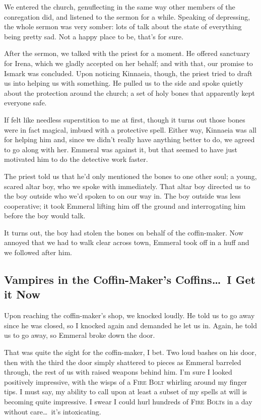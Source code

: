 We entered the church, genuflecting in the same way other members of the conregation did, and listened to the sermon for a while. Speaking of depressing, the whole sermon was very somber: lots of talk about the state of everything being pretty sad. Not a happy place to be, that's for sure.

After the sermon, we talked with the priest for a moment. He offered sanctuary for Irena, which we gladly accepted on her behalf; and with that, our promise to Ismark was concluded. Upon noticing Kinnaeia, though, the priest tried to draft us into helping us with something. He pulled us to the side and spoke quietly about the protection around the church; a set of holy bones that apparently kept everyone safe.

If felt like needless superstition to me at first, though it turns out those bones were in fact magical, imbued with a protective spell. Either way, Kinnaeia was all for helping him and, since we didn't really have anything better to do, we agreed to go along with her. Emmeral was against it, but that seemed to have just motivated him to do the detective work faster.

The priest told us that he'd only mentioned the bones to one other soul; a young, scared altar boy, who we spoke with immediately. That altar boy directed us to the boy outside who we'd spoken to on our way in. The boy outside was less cooperative; it took Emmeral lifting him off the ground and interrogating him before the boy would talk.

It turns out, the boy had stolen the bones on behalf of the coffin-maker. Now annoyed that we had to walk clear across town, Emmeral took off in a huff and we followed after him.

\subsection*{Vampires in the Coffin-Maker's Coffins\dots\ I Get it Now}
Upon reaching the coffin-maker's shop, we knocked loudly. He told us to go away since he was closed, so I knocked again and demanded he let us in. Again, he told us to go away, so Emmeral broke down the door.

That was quite the sight for the coffin-maker, I bet. Two loud bashes on his door, then with the third the door simply shattered to pieces as Emmeral barreled through, the rest of us with raised weapons behind him. I'm sure I looked positively impressive, with the wisps of a \textsc{Fire Bolt} whirling around my finger tips. I must say, my ability to call upon at least a subset of my spells at will is becoming quite impressive. I swear I could hurl hundreds of \textsc{Fire Bolt}s in a day without care\dots\ it's intoxicating.

